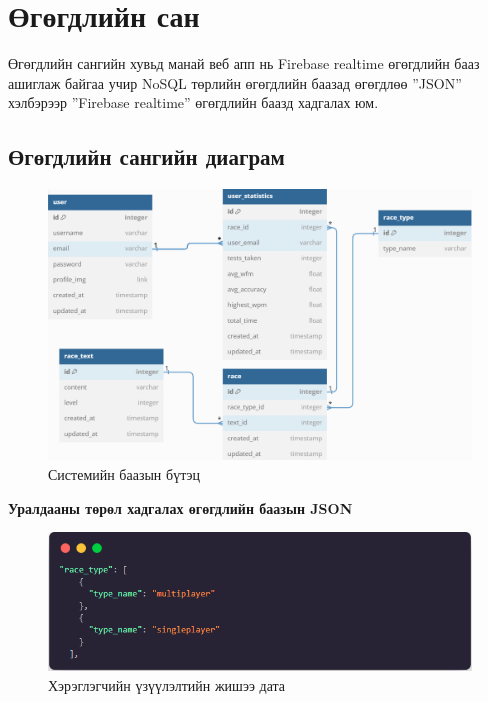 \clearpage

\section{Өгөгдлийн сан}
Өгөгдлийн сангийн хувьд манай веб апп нь Firebase realtime өгөгдлийн бааз ашиглаж байгаа учир NoSQL төрлийн өгөгдлийн баазад өгөгдлөө ”JSON” хэлбэрээр ”Firebase realtime” өгөгдлийн баазд хадгалах юм.

\subsection{Өгөгдлийн сангийн диаграм}
\begin{figure}[h]
	\centering
	\includegraphics[width=17cm]{images/db_structure.png}
	\caption{Системийн баазын бүтэц}
	\label{fig:erd}
\end{figure}

\pagebreak

\textbf{Уралдааны төрөл хадгалах өгөгдлийн баазын JSON}

\begin{figure}[h]
	\centering
	\includegraphics[width=15cm]{images/race_type_json.png}
	\caption{Хэрэглэгчийн үзүүлэлтийн жишээ дата}
	\label{fig:erd}
\end{figure}

